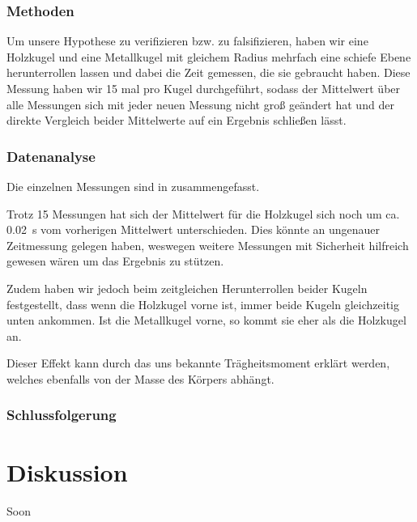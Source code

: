 \documentclass[11pt,a4paper,titlepage, ngerman]{article}
\begin{document}
		\subsubsection{Methoden}
			Um unsere Hypothese zu verifizieren bzw. zu falsifizieren, haben wir eine Holzkugel und eine Metallkugel mit gleichem Radius mehrfach eine schiefe Ebene herunterrollen lassen und dabei die Zeit gemessen, die sie gebraucht haben.
			Diese Messung haben wir 15 mal pro Kugel durchgeführt, sodass der Mittelwert über alle Messungen sich mit jeder neuen Messung nicht groß geändert hat und der direkte Vergleich beider Mittelwerte auf ein Ergebnis schließen lässt.
			
		\subsubsection{Datenanalyse}
			Die einzelnen Messungen sind in %
			zusammengefasst.
					
			Trotz 15 Messungen hat sich der Mittelwert für die Holzkugel sich noch um ca. \SI{0.02}{s} vom vorherigen Mittelwert unterschieden. Dies könnte an ungenauer Zeitmessung gelegen haben, weswegen weitere Messungen mit Sicherheit hilfreich gewesen wären um das Ergebnis zu stützen.
			
			Zudem haben wir jedoch beim zeitgleichen Herunterrollen beider Kugeln festgestellt, dass wenn die Holzkugel vorne ist, immer beide Kugeln gleichzeitig unten ankommen.
			Ist die Metallkugel vorne, so kommt sie eher als die Holzkugel an.
			
		
			Dieser Effekt kann durch das uns bekannte Trägheitsmoment erklärt werden, welches ebenfalls von der Masse des Körpers abhängt.
			
			\subsubsection{Schlussfolgerung}

\section{Diskussion}

	\label{Diskussion}
	
	Soon\texttrademark
	
\begin{thebibliography}{}

\end{thebibliography}
\end{document}
